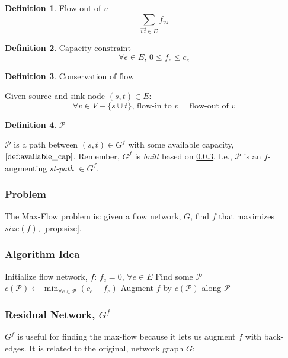 \documentclass{article}
\theoremstyle{definition}
\newtheorem{definition}{Definition}[section]
\begin{document}
\begin{definition}{Flow-out of $v$}
\label{def:flowout}
$$\sum_{\overrightarrow{vz} \in E}{f_{vz}}$$
\end{definition}

\begin{definition}{$\text{Capacity constraint}$}
\label{prop:capacity}
$$\forall e \in E, \, 0 \leq f_e \leq c_e$$
\end{definition}

\begin{definition}{$\text{Conservation of flow}$}
\label{prop:conservation}

Given source and sink node $(s,t) \in E$:
$$\forall v \in V - \{s \cup t\}, \, \text{flow-in to } v = \text{flow-out of } v$$ 
\end{definition}

\begin{definition}{$\mathcal{P}$}
\label{prop:cal_p}	

	$\mathcal{P}$ is a path between $(s,t) \in G^f$ with some available capacity, $\ref{def:available_cap}$. Remember, $G^f$ is \textit{built} based on \ref{residual_net}. I.e., $\mathcal{P}$ is an $f$-augmenting \textit{st-path} $\in G^f$. 
\end{definition}

\subsubsection{Problem}
The Max-Flow problem is: given a flow network, $G$, find $f$ that maximizes $size(f)$, \ref{prop:size}.

\subsubsection{Algorithm Idea}
\begin{algorithm}
\caption{$NaiveMaxFlow$}
\label{alg:naive_max_flow}
\begin{algorithmic}[1]
	\STATE Initialize flow network, $f$: $f_e = 0, \, \forall e \in E$
	\STATE Find some $\mathcal{P}$ 
		\STATE $c(\mathcal{P}) \gets \min_{\forall e \in \mathcal{P}} (c_e-f_e)$
		\STATE Augment $f$ by $c(\mathcal{P})$ along $\mathcal{P}$
	\ENDWHILE
\end{algorithmic}
\end{algorithm}

\subsubsection{Residual Network, $G^f$}
\label{residual_net}
$G^f$ is useful for finding the max-flow because it lets us augment $f$ with back-edges. It is related to the original, network graph $G$:
\end{document}
